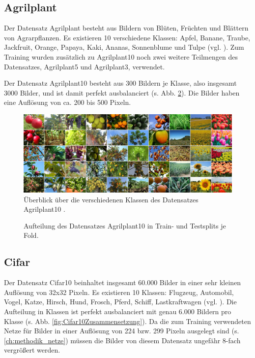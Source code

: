 \subsection{Agrilplant}
Der Datensatz Agrilplant \cite{pawaraWebsiteDatensaetze} besteht aus Bildern von Blüten, Früchten und Blättern von Agrarpflanzen.
Es existieren 10 verschiedene Klassen: Apfel, Banane, Traube, Jackfruit, Orange, Papaya, Kaki, Ananas, Sonnenblume und Tulpe (vgl. \cite{pawaraWebsiteDatensaetze}).
Zum Training wurden zusätzlich zu Agrilplant10 noch zwei weitere Teilmengen des Datensatzes, Agrilplant5 und Agrilplant3, verwendet.

Der Datensatz Agrilplant10 besteht aus 300 Bildern je Klasse, also insgesamt 3000 Bilder, und ist damit perfekt ausbalanciert (s. Abb. \ref{fig:Agrilplant10Zusammensetzung}).
Die Bilder haben eine Auflösung von ca. 200 bis 500 Pixeln. \\

\begin{figure}[H]
\includegraphics[scale=0.2]{img/2_agrilplant-image.jpg}
\caption{Überblick über die verschiedenen Klassen des Datensatzes Agrilplant10 \cite{pawaraAgrilplant}.}
\label{fig:agrilplantUeberblick}
\end{figure}

\begin{figure}[H]
\begin{adjustbox}{width=1.1\textwidth, center}

\end{adjustbox}
\caption{Aufteilung des Datensatzes Agrilplant10 \cite{pawaraWebsiteDatensaetze} in Train- und Testsplits je Fold.}
\label{fig:Agrilplant10Zusammensetzung}
\end{figure}


\subsection{Cifar}
\label{ch:methodik_datensaetzeCifar10}
Der Datensatz Cifar10 beinhaltet insgesamt 60.000 Bilder in einer sehr kleinen Auflösung von 32x32 Pixeln. Es existieren 10 Klassen: Flugzeug, Automobil, Vogel, Katze, Hirsch, Hund, Frosch, Pferd, Schiff, Lastkraftwagen (vgl. \cite{cifar10}).
Die Aufteilung in Klassen ist perfekt ausbalanciert mit genau 6.000 Bildern pro Klasse (s. Abb. \ref{fig:Cifar10Zusammensetzung}).
Da die zum Training verwendeten Netze für Bilder in einer Auflösung von 224 bzw. 299 Pixeln ausgelegt sind (s. \ref{ch:methodik_netze}) müssen die Bilder von diesem Datensatz ungefähr 8-fach vergrößert werden.\\

